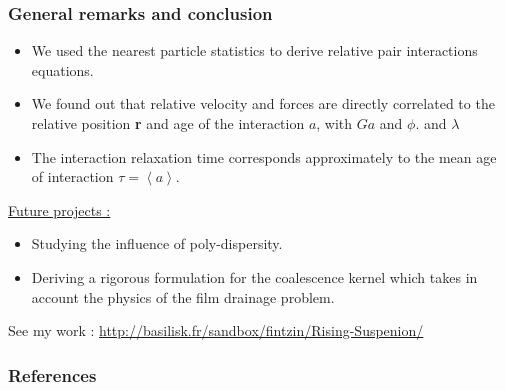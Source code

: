 \documentclass{sintefbeamer}
\newcommand{\avg}[1]{\left<#1\right>}
\begin{document}
\begin{frame}
  \frametitle{General remarks and conclusion}

  \begin{itemize}
    \item We used the nearest particle statistics to derive relative pair interactions equations. 
    \item We found out that relative velocity and forces are directly correlated to the relative position \textbf{r} and age of the interaction $a$, with $Ga$ and $\phi$. and $\lambda$ 
    \item The interaction relaxation time corresponds approximately to the mean age of interaction $\tau =\avg{a}$. 
  \end{itemize}
    \underline{Future projects : }  
    \begin{itemize}
      \item Studying the influence of poly-dispersity. 
      \item Deriving a rigorous formulation for the coalescence kernel which takes in account the physics of the film drainage problem. 
    \end{itemize}
\vfill    
See my work : \url{http://basilisk.fr/sandbox/fintzin/Rising-Suspenion/}

\end{frame}

\begin{frame}[t]
  \frametitle{References}
  
\end{frame}


 
\backmatter


\section*{}
\end{document}
